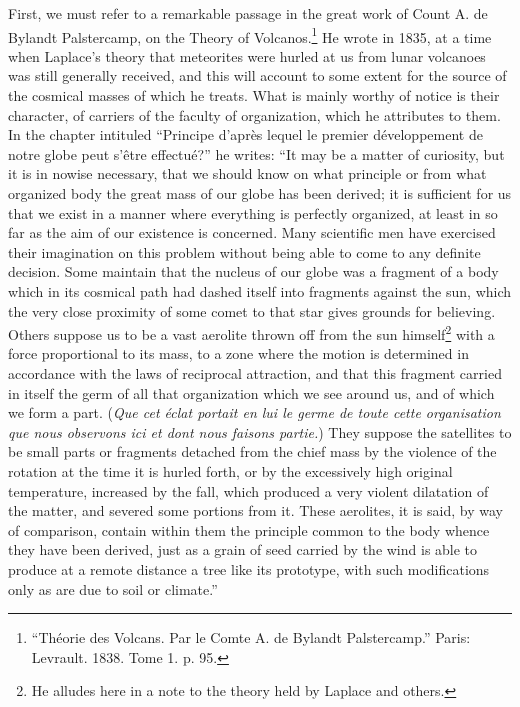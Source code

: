 \documentclass[a4paper, 11pt, oneside, english]{article}
\begin{document}
First, we must refer to a remarkable passage in the great work of Count A. de Bylandt Palstercamp, on the Theory of Volcanos.\footnote{``Théorie des Volcans. Par le Comte A. de Bylandt Palstercamp.'' Paris: Levrault. 1838. Tome 1. p. 95.} He wrote in 1835, at a time when Laplace's theory that meteorites were hurled at us from lunar volcanoes was still generally received, and this will account to some extent for the source of the cosmical masses of which he treats. What is mainly worthy of notice is their character, of carriers of the faculty of organization, which he attributes to them. In the chapter intituled ``Principe d'après lequel le premier développement de notre globe peut s'être effectué?'' he writes: ``It may be a matter of curiosity, but it is in nowise necessary, that we should know on what principle or from what organized body the great mass of our globe has been derived; it is sufficient for us that we exist in a manner where everything is perfectly organized, at least in so far as the aim of our existence is concerned. Many scientific men have exercised their imagination on this problem without being able to come to any definite decision. Some maintain that the nucleus of our globe was a fragment of a body which in its cosmical path had dashed itself into fragments against the sun, which the very close proximity of some comet to that star gives grounds for believing. Others suppose us to be a vast aerolite thrown off from the sun himself\footnote{He alludes here in a note to the theory held by Laplace and others.} with a force proportional to its mass, to a zone where the motion is determined in accordance with the laws of reciprocal attraction, and that this fragment carried in itself the germ of all that organization which we see around us, and of which we form a part. (\emph{Que cet éclat portait en lui le germe de toute cette organisation que nous observons ici et dont nous faisons partie.}) They suppose the satellites to be small parts or fragments detached from the chief mass by the violence of the rotation at the time it is hurled forth, or by the excessively high original temperature, increased by the fall, which produced a very violent dilatation of the matter, and severed some portions from it. These aerolites, it is said, by way of comparison, contain within them the principle common to the body whence they have been derived, just as a grain of seed carried by the wind is able to produce at a remote distance a tree like its prototype, with such modifications only as are due to soil or climate.''
\end{document}
